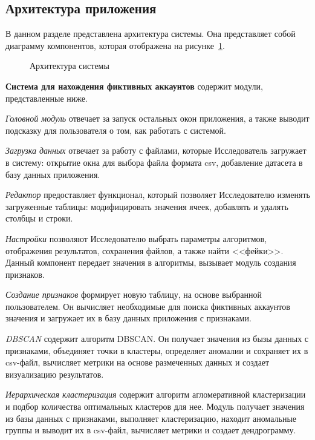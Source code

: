 \subsection{Архитектура приложения}
\label{subsec:Architecture}
В данном разделе представлена архитектура системы. Она представляет собой диаграмму компонентов, которая отображена на рисунке~\ref{ris:arch}.

\begin{figure}[ht]
    \caption{Архитектура системы}
    \label{ris:arch}
\end{figure}


\textbf{Система для нахождения фиктивных аккаунтов} содержит модули, представленные ниже.

\textit{Головной модуль} отвечает за запуск остальных окон приложения, а также выводит подсказку для пользователя о том, как работать с системой.

\textit{Загрузка данных} отвечает за работу с файлами, которые Исследователь загружает в систему: открытие окна для выбора файла формата csv, добавление датасета в базу данных приложения.

\textit{Редактор} предоставляет функционал, который позволяет Исследователю изменять загруженные таблицы: модифицировать значения ячеек, добавлять и удалять столбцы и строки.

\textit{Настройки} позволяют Исследователю выбрать параметры алгоритмов, отображения результатов, сохранения файлов, а также найти <<фейки>>. Данный компонент передает значения в алгоритмы, вызывает модуль создания признаков.

\textit{Создание признаков} формирует новую таблицу, на основе выбранной пользователем. Он вычисляет необходимые для поиска фиктивных аккаунтов значения и загружает их в базу данных приложения с признаками.

\textit{DBSCAN} содержит алгоритм DBSCAN. Он получает значения из бызы данных с признаками, объединяет точки в кластеры, определяет аномалии и сохраняет их в csv-файл, вычисляет метрики на основе размеченных данных и создает визуализацию результатов.

\textit{Иерархическая кластеризация} содержит алгоритм агломеративной кластеризации и подбор количества оптимальных кластеров для нее. Модуль получает значения из базы данных с признаками, выполняет кластеризацию, находит аномальные группы и выводит их в csv-файл, вычисляет метрики и создает дендрограмму.

